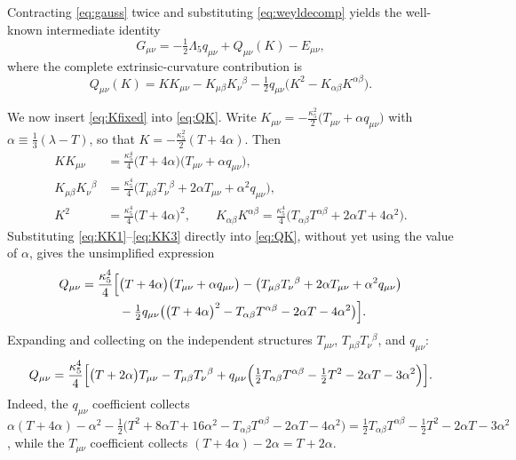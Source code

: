 \documentclass[11pt,a4paper]{article}
\theoremstyle{plain}
\theoremstyle{definition}
\newcommand{\kfive}{\kappa_5}
\newcommand{\Lfive}{\Lambda_5}
\begin{document}
Contracting \eqref{eq:gauss} twice and substituting
\eqref{eq:weyldecomp} yields the well-known intermediate identity
\begin{equation}
\label{eq:Gintermediate}
G_{\mu\nu}
=-\tfrac12\Lfive q_{\mu\nu}
+Q_{\mu\nu}(K)-E_{\mu\nu},
\end{equation}
where the complete extrinsic-curvature contribution is
\begin{equation}
\label{eq:QK}
Q_{\mu\nu}(K)
=KK_{\mu\nu}-K_{\mu\beta}K_\nu{}^\beta
-\tfrac12q_{\mu\nu}\bigl(K^2-K_{\alpha\beta}K^{\alpha\beta}\bigr).
\end{equation}

We now insert \eqref{eq:Kfixed} into \eqref{eq:QK}. Write
$K_{\mu\nu}=-\tfrac{\kfive^2}{2}\bigl(T_{\mu\nu}+\alpha q_{\mu\nu}\bigr)$
with $\alpha\equiv\tfrac13(\lambda-T)$, so that
$K=-\tfrac{\kfive^2}{2}(T+4\alpha)$. Then
\begin{align}
KK_{\mu\nu}
&=\frac{\kfive^4}{4}\bigl(T+4\alpha\bigr)
\bigl(T_{\mu\nu}+\alpha q_{\mu\nu}\bigr),
\label{eq:KK1}\\
K_{\mu\beta}K_\nu{}^\beta
&=\frac{\kfive^4}{4}
\bigl(T_{\mu\beta}T_\nu{}^\beta
+2\alpha T_{\mu\nu}+\alpha^2q_{\mu\nu}\bigr),
\label{eq:KK2}\\
K^2
&=\frac{\kfive^4}{4}\bigl(T+4\alpha\bigr)^2,
\qquad
K_{\alpha\beta}K^{\alpha\beta}
=\frac{\kfive^4}{4}
\bigl(T_{\alpha\beta}T^{\alpha\beta}
+2\alpha T+4\alpha^2\bigr).
\label{eq:KK3}
\end{align}
Substituting \eqref{eq:KK1}--\eqref{eq:KK3} directly into \eqref{eq:QK},
without yet using the value of $\alpha$, gives the unsimplified expression
\begin{equation}
\label{eq:Qexpanded}
\begin{aligned}
Q_{\mu\nu}
=\frac{\kfive^4}{4}\Bigl[
&\bigl(T+4\alpha\bigr)\bigl(T_{\mu\nu}+\alpha q_{\mu\nu}\bigr)
-\bigl(T_{\mu\beta}T_\nu{}^\beta
+2\alpha T_{\mu\nu}+\alpha^2q_{\mu\nu}\bigr)\\
&-\tfrac12 q_{\mu\nu}
\bigl(\bigl(T+4\alpha\bigr)^2
-T_{\alpha\beta}T^{\alpha\beta}
-2\alpha T-4\alpha^2\bigr)
\Bigr].
\end{aligned}
\end{equation}
Expanding and collecting on the independent structures
$T_{\mu\nu}$, $T_{\mu\beta}T_\nu{}^\beta$, and $q_{\mu\nu}$:
\begin{equation}
\label{eq:Qsimplified}
Q_{\mu\nu}
=\frac{\kfive^4}{4}\Bigl[
\bigl(T+2\alpha\bigr)T_{\mu\nu}
-T_{\mu\beta}T_\nu{}^\beta
+q_{\mu\nu}\Bigl(
\tfrac12 T_{\alpha\beta}T^{\alpha\beta}
-\tfrac12 T^2
-2\alpha T
-3\alpha^2
\Bigr)\Bigr].
\end{equation}
Indeed, the $q_{\mu\nu}$ coefficient collects
$\alpha(T+4\alpha)-\alpha^2
-\tfrac12\bigl(T^2+8\alpha T+16\alpha^2
-T_{\alpha\beta}T^{\alpha\beta}-2\alpha T-4\alpha^2\bigr)
=\tfrac12 T_{\alpha\beta}T^{\alpha\beta}-\tfrac12T^2-2\alpha T-3\alpha^2$,
while the $T_{\mu\nu}$ coefficient collects $(T+4\alpha)-2\alpha=T+2\alpha$.
\end{document}
